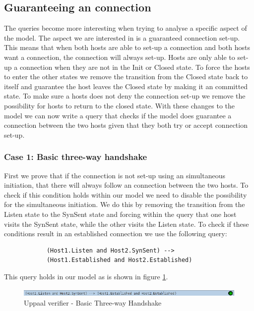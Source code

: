\documentclass[twocolumn]{article}
\begin{document}
	\subsection{Guaranteeing an connection} %
	\label{sub:guaranteeing_an_connection}
		The queries become more interesting when trying to analyse a specific aspect of the model. The aspect we are interested in is a guaranteed connection set-up. This means that when both hosts are able to set-up a connection and both hosts want a connection, the connection will always set-up. Hosts are only able to set-up a connection when they are not in the Init or Closed state. To force the hosts to enter the other states we remove the transition from the Closed state back to itself and guarantee the host leaves the Closed state by making it an committed state. To make sure a hosts does not deny the connection set-up we remove the possibility for hosts to return to the closed state. With these changes to the model we can now write a query that checks if the model does guarantee a connection between the two hosts given that they both try or accept connection set-up.

		\subsubsection{Case 1: Basic three-way handshake}
		First we prove that if the connection is not set-up using an simultaneous initiation, that there will always follow an connection between the two hosts. To check if this condition holds within our model we need to disable the possibility for the simultaneous initiation. We do this by removing the transition from the Listen state to the SynSent state and forcing within the query that one host visits the SynSent state, while the other visits the Listen state. To check if these conditions result in an established connection we use the following query:
		\begin{verbatim}
			(Host1.Listen and Host2.SynSent) -->
			(Host1.Established and Host2.Established)
		\end{verbatim}
		This query holds in our model as is shown in figure \ref{fig:verifier2}.
		\begin{figure}[h!]
			\begin{center}
				\includegraphics[width=\linewidth]{verifier-listen.png}
			\end{center}
			\caption{Uppaal verifier - Basic Three-way Handshake}
			\label{fig:verifier2}
		\end{figure}
		
\end{document}

